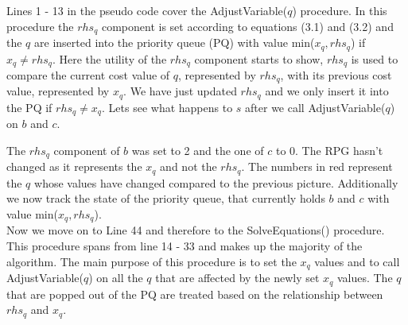 Lines 1 - 13 in the pseudo code cover the AdjustVariable($q$) procedure. In this procedure the $rhs_q$ component is set according to equations (3.1) and (3.2) and the $q$ are inserted into the priority queue (PQ)  with value min($x_q, rhs_q$) if $x_q \neq rhs_q$. Here the utility of the $rhs_q$ component starts to show, $rhs_q$ is used to compare the current cost value of $q$, represented by $rhs_q$, with its previous cost value, represented by $x_q$. We have just updated $rhs_q$ and we only insert it into the PQ if $rhs_q \neq x_q$. Lets see what happens to $s$ after we call AdjustVariable($q$) on $b$ and $c$.
\newpage
\begin{center}
\end{center}

The $rhs_q$ component of $b$ was set to 2 and the one of $c$ to 0. The RPG hasn't changed as it represents the $x_q$ and not the $rhs_q$. The numbers in red represent the $q$ whose values have changed compared to the previous picture. Additionally we now track the state of the priority queue, that currently holds $b$ and $c$ with value min($x_q, rhs_q$).  \\

Now we move on to Line 44 and therefore to the SolveEquations() procedure. This procedure spans from line 14 - 33 and makes up the majority of the algorithm. The main purpose of this procedure is to set the $x_q$ values and to call AdjustVariable($q$) on all the $q$ that are affected by the newly set $x_q$ values. The $q$ that are popped out of the PQ are treated based on the relationship between $rhs_q$ and $x_q$. \\

